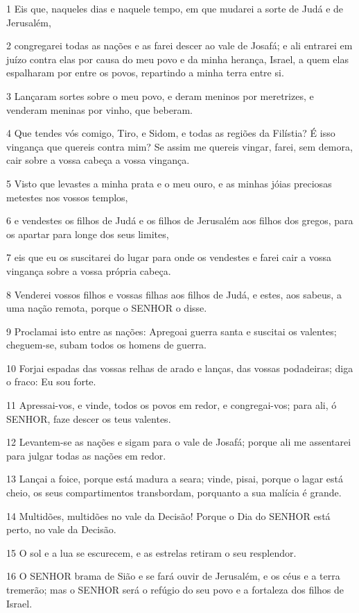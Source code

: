 \par 1 Eis que, naqueles dias e naquele tempo, em que mudarei a sorte de Judá e de Jerusalém,
\par 2 congregarei todas as nações e as farei descer ao vale de Josafá; e ali entrarei em juízo contra elas por causa do meu povo e da minha herança, Israel, a quem elas espalharam por entre os povos, repartindo a minha terra entre si.
\par 3 Lançaram sortes sobre o meu povo, e deram meninos por meretrizes, e venderam meninas por vinho, que beberam.
\par 4 Que tendes vós comigo, Tiro, e Sidom, e todas as regiões da Filístia? É isso vingança que quereis contra mim? Se assim me quereis vingar, farei, sem demora, cair sobre a vossa cabeça a vossa vingança.
\par 5 Visto que levastes a minha prata e o meu ouro, e as minhas jóias preciosas metestes nos vossos templos,
\par 6 e vendestes os filhos de Judá e os filhos de Jerusalém aos filhos dos gregos, para os apartar para longe dos seus limites,
\par 7 eis que eu os suscitarei do lugar para onde os vendestes e farei cair a vossa vingança sobre a vossa própria cabeça.
\par 8 Venderei vossos filhos e vossas filhas aos filhos de Judá, e estes, aos sabeus, a uma nação remota, porque o SENHOR o disse.
\par 9 Proclamai isto entre as nações: Apregoai guerra santa e suscitai os valentes; cheguem-se, subam todos os homens de guerra.
\par 10 Forjai espadas das vossas relhas de arado e lanças, das vossas podadeiras; diga o fraco: Eu sou forte.
\par 11 Apressai-vos, e vinde, todos os povos em redor, e congregai-vos; para ali, ó SENHOR, faze descer os teus valentes.
\par 12 Levantem-se as nações e sigam para o vale de Josafá; porque ali me assentarei para julgar todas as nações em redor.
\par 13 Lançai a foice, porque está madura a seara; vinde, pisai, porque o lagar está cheio, os seus compartimentos transbordam, porquanto a sua malícia é grande.
\par 14 Multidões, multidões no vale da Decisão! Porque o Dia do SENHOR está perto, no vale da Decisão.
\par 15 O sol e a lua se escurecem, e as estrelas retiram o seu resplendor.
\par 16 O SENHOR brama de Sião e se fará ouvir de Jerusalém, e os céus e a terra tremerão; mas o SENHOR será o refúgio do seu povo e a fortaleza dos filhos de Israel.
